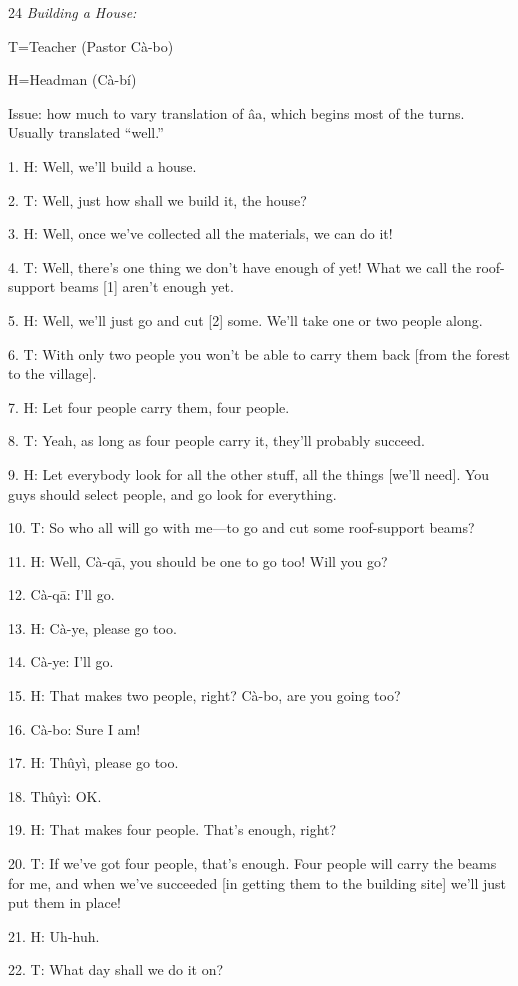 
{24}{\textit{ Building a House:}}

{T=Teacher (Pastor Cà-bo)}

{H=Headman (Cà-bí)}

{Issue: how much to vary translation of âa, which begins most of the turns.
Usually translated ``well.''}

{1. H: Well, we'll build a house.}

{2. T: Well, just how shall we build it, the house?}

{3. H: Well, once we've collected all the materials, we can do it!}

{4. T: Well, there's one thing we don't have enough of yet!  What we call
the roof-support beams [1] aren't enough yet.}

{5. H: Well, we'll just go and cut [2] some. We'll take one or two people
along.}

{6. T: With only two people you won't be able to carry them back [from the
forest to the village].}

{7. H: Let four people carry them, four people.}

{8. T: Yeah, as long as four people carry it, they'll probably succeed.}

{9. H: Let everybody look for all the other stuff, all the things [we'll
need].  You guys should select people, and go look for everything.}

{10. T: So who all will go with me---to go and cut some roof-support beams?}

{11. H: Well, Cà-qā, you should be one to go too!  Will you go?}

{12. Cà-qā: I'll go.}

{13. H: Cà-ye, please go too.}

{14. Cà-ye: I'll go.}

{15. H: That makes two people, right? Cà-bo, are you going too?}

{16. Cà-bo: Sure I am!}

{17. H: Thûyì, please go too.}

{18. Thûyì: OK.}

{19. H: That makes four people.  That's enough, right?}

{20. T: If we've got four people, that's enough.  Four people will carry
the beams for me, and when we've succeeded [in getting them to the building site]
we'll just put them in place!}

{21. H: Uh-huh.}

{22. T: What day shall we do it on?}

